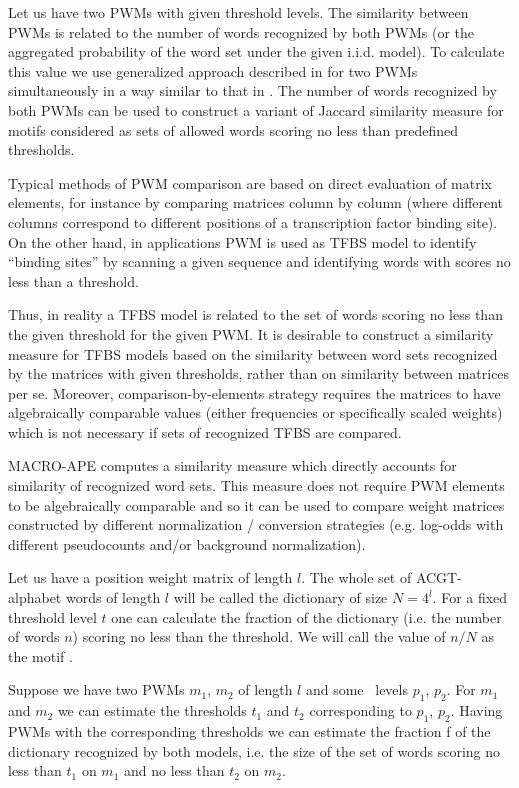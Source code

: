 Let us have two PWMs with given threshold levels. The similarity between PWMs is
related to the number of words recognized by both PWMs
(or the aggregated probability of the word set under the given i.i.d. model).
To calculate this value we use generalized approach
described in \cite{Touzet2007} for two PWMs simultaneously in a way similar to that in \cite{Pape2008}.
The number of words recognized by both PWMs can be used to construct a variant of Jaccard
similarity measure for motifs considered as sets of allowed words scoring no less than predefined thresholds.

Typical methods of PWM comparison are based on direct evaluation of matrix elements, for instance
by comparing matrices column by column (where different columns correspond to different 
positions of a transcription factor binding site).
On the other hand, in applications PWM is used as TFBS model
to identify “binding sites” by scanning a given sequence and identifying words with scores
no less than a threshold.

Thus, in reality a TFBS model is related to the set of words
scoring no less than the given threshold for the given PWM. It is desirable to construct a 
similarity measure for TFBS models based on the similarity between word sets recognized
by the matrices with given thresholds, rather than on  similarity between matrices per
se. Moreover, comparison-by-elements strategy requires the matrices to have algebraically 
comparable values (either frequencies or specifically scaled weights) which is not necessary if 
sets of recognized TFBS are compared.

MACRO-APE computes a similarity measure which directly accounts for similarity of
recognized word sets. This measure does not require PWM elements to be algebraically 
comparable and so it can be used to compare weight matrices constructed by different 
normalization / conversion strategies (e.g. log-odds with different pseudocounts and/or background normalization).

Let us have a position weight matrix of length $l$. The whole set of ACGT-alphabet 
words of length $l$ will be called the dictionary of size $N=4^l$. For a fixed threshold level $t$ one 
can calculate the fraction of the dictionary (i.e. the number of words $n$) scoring no less than the 
threshold. We will call the value of $n / N$ as the motif \pvalue.

Suppose we have two PWMs $m_1$, $m_2$ of length $l$ and some \pvalue\ levels $p_1$, $p_2$. For $m_1$
and $m_2$ we can estimate the thresholds $t_1$ and $t_2$ corresponding to $p_1$, $p_2$. Having PWMs with the 
corresponding thresholds we can estimate the fraction f of the dictionary recognized by both 
models, i.e. the size of the set of words scoring no less than $t_1$ on $m_1$ and no less than $t_2$ on $m_2$.


